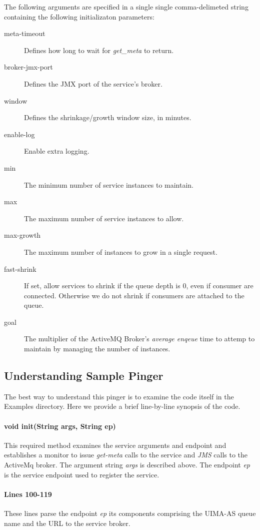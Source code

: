     The following arguments are specified in a single single comma-delimeted
    string containing the following initializaton parameters:
    \begin{description}
      \item[meta-timeout] Defines how long to wait for {\em get\_meta} to return.
      \item[broker-jmx-port] Defines the JMX port of the service's broker.
      \item[window] Defines the shrinkage/growth window size, in minutes.
      \item[enable-log] Enable extra logging.
      \item[min] The minimum number of service instances to maintain.
      \item[max] The maximum number of service instances to allow.
      \item[max-growth] The maximum number of instances to grow in a
        single request.
      \item[fast-shrink] If set, allow services to shrink if the
        queue depth is 0, even if consumer are connected.  Otherwise
        we do not shrink if consumers are attached to the queue.
      \item[goal] The multiplier of the ActiveMQ Broker's {\em average enqeue}
        time to attemp to maintain by managing the number of instances.
    \end{description}

    
    \subsection{Understanding  Sample Pinger}

    The best way to understand this pinger is to examine the code itself in the
    Examples directory.  Here we provide a brief line-by-line synopsis of the code.

    \paragraph{void init(String args, String ep)}
    This required method examines the service arguments and endpoint and establishes a monitor
    to issue {\em get-meta} calls to the service and {\em JMS} calls to the 
    ActiveMq broker.  The argument string {\em args} is described above.  The
    endpoint {\em ep} is the service endpoint used to register the service.

    \paragraph{Lines 100-119}
    These lines parse the endpoint {\em ep} its components comprising the
    UIMA-AS queue name and the URL to the service broker.


